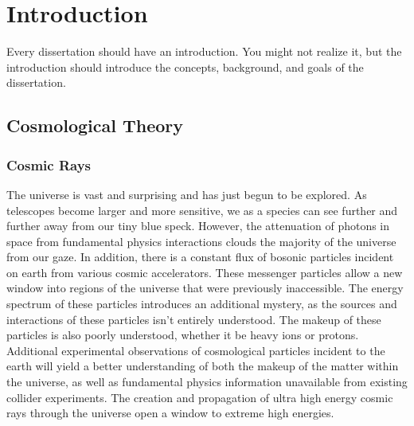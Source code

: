


\chapter{Introduction}

Every dissertation should have an introduction.  You might not realize
it, but the introduction should introduce the concepts, background,
and goals of the dissertation.

\section{Cosmological Theory}
	\subsection{Cosmic Rays}
		The universe is vast and surprising and has just begun to be explored.  As telescopes become larger and more sensitive, we as a species can see further and further away from our tiny blue speck.  However, the attenuation of photons in space from fundamental physics interactions clouds the majority of the universe from our gaze.  In addition, there is a constant flux of bosonic particles incident on earth from various cosmic accelerators.  These messenger particles allow a new window into regions of the universe that were previously inaccessible.  The energy spectrum of these particles introduces an additional mystery, as the sources and interactions of these particles isn't entirely understood.  The makeup of these particles is also poorly understood, whether it be heavy ions or protons.  Additional experimental observations of cosmological particles incident to the earth will yield a better understanding of both the makeup of the matter within the universe, as well as fundamental physics information unavailable from existing collider experiments.  The creation and propagation of ultra high energy cosmic rays through the universe open a window to extreme high energies.
